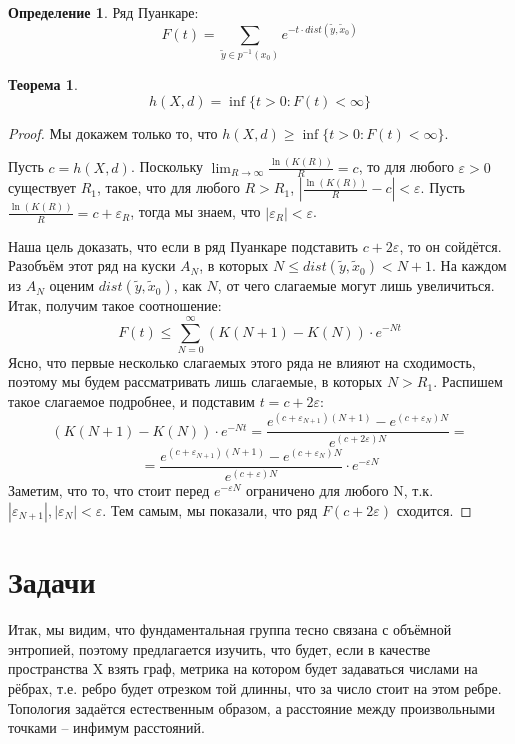 \documentclass[11pt]{article}
\theoremstyle{definition}
\newtheorem{defin}{Определение}%
\theoremstyle{plain}
\theoremstyle{plain}
\newtheorem{theorem}{Теорема}
\def\leq{\leqslant}
\def\geq{\geqslant}
\def\wt#1{\widetilde{#1}}
\def\eps{\varepsilon}
\begin{document}
\begin{defin}
Ряд Пуанкаре:
$$
  F(t) = \sum_{\wt{y} \in p^{-1}(x_0)} e^{-t \cdot dist(\wt{y}, \wt{x}_0)}
$$
\end{defin}

\begin{theorem}
$$
h(X,d) = \inf \{t>0: F(t) < \infty\}
$$
\end{theorem}

\begin{proof} Мы докажем только то, что $h(X,d) \geq \inf \{t>0: F(t) < \infty\}$.

Пусть $c = h(X, d)$. Поскольку $\lim_{R \rightarrow \infty} \frac{\ln (K(R))} {R} = c$, то для любого $\eps > 0$ 
существует $R_1$, такое, что для любого $R > R_1$, $\left|\frac{\ln (K(R))} {R} - c\right| < \eps$.
Пусть $\frac{\ln (K(R))} {R} = c + \eps_R$, тогда мы знаем, что $|\eps_R| < \eps$.

Наша цель доказать, что если в ряд Пуанкаре подставить $c + 2\eps$, то он сойдётся.
Разобъём этот ряд на куски $A_N$, в которых $N \leq dist(\wt{y}, \wt{x}_0) < N+1$. На каждом из $A_N$ оценим $dist(\wt{y}, \wt{x}_0)$, как $N$, 
от чего слагаемые могут лишь увеличиться. Итак, получим такое соотношение:
$$
F(t) \leq \sum_{N=0}^{\infty} (K(N+1)-K(N))\cdot e^{-Nt}
$$
Ясно, что первые несколько слагаемых этого ряда не влияют на сходимость, поэтому мы будем рассматривать лишь слагаемые, в которых $N > R_1$.
Распишем такое слагаемое подробнее, и подставим $t = c + 2\eps$:
$$
(K(N+1)-K(N))\cdot e^{-Nt} = \frac{e^{(c + \eps_{N+1})(N+1)} - e^{(c + \eps_{N})N}}  {e^{(c+2\eps)N}} = 
$$
$$
= \frac{e^{(c + \eps_{N+1})(N+1)} - e^{(c + \eps_{N})N}}  {e^{(c+\eps)N}} \cdot e^{-\eps N}
$$
Заметим, что то, что стоит перед $e^{-\eps N}$ ограничено для любого N, т.к. $|\eps_{N+1}|, |\eps_{N}| < \eps$. 
Тем самым, мы показали, что ряд $F(c+2\eps)$ сходится.





\end{proof}

\section{Задачи}
Итак, мы видим, что фундаментальная группа тесно связана с объёмной энтропией, поэтому предлагается изучить, что будет, 
если в качестве пространства X взять граф, метрика на котором будет задаваться числами на рёбрах, 
т.е. ребро будет отрезком той длинны, что за число стоит на этом ребре. Топология задаётся естественным образом, 
а расстояние между произвольными точками -- инфимум расстояний.
\end{document}
